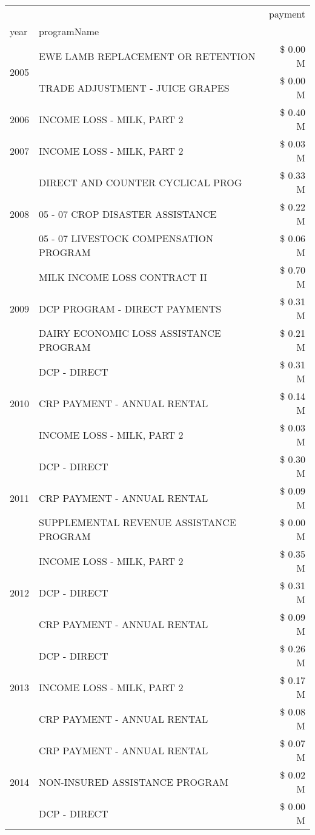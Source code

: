\begin{tabular}{llr}
\toprule
 &  & payment \\
year & programName &  \\
\midrule
\multirow[t]{2}{*}{2005} & EWE LAMB REPLACEMENT OR RETENTION & \$ 0.00 M \\
 & TRADE ADJUSTMENT - JUICE GRAPES & \$ 0.00 M \\
\cline{1-3}
2006 & INCOME LOSS - MILK, PART 2 & \$ 0.40 M \\
\cline{1-3}
2007 & INCOME LOSS - MILK, PART 2 & \$ 0.03 M \\
\cline{1-3}
\multirow[t]{3}{*}{2008} & DIRECT AND COUNTER CYCLICAL PROG & \$ 0.33 M \\
 & 05 - 07 CROP DISASTER ASSISTANCE & \$ 0.22 M \\
 & 05 - 07 LIVESTOCK COMPENSATION PROGRAM & \$ 0.06 M \\
\cline{1-3}
\multirow[t]{3}{*}{2009} & MILK INCOME LOSS CONTRACT II & \$ 0.70 M \\
 & DCP PROGRAM - DIRECT PAYMENTS & \$ 0.31 M \\
 & DAIRY ECONOMIC LOSS ASSISTANCE PROGRAM & \$ 0.21 M \\
\cline{1-3}
\multirow[t]{3}{*}{2010} & DCP - DIRECT & \$ 0.31 M \\
 & CRP PAYMENT - ANNUAL RENTAL & \$ 0.14 M \\
 & INCOME LOSS - MILK, PART 2 & \$ 0.03 M \\
\cline{1-3}
\multirow[t]{3}{*}{2011} & DCP - DIRECT & \$ 0.30 M \\
 & CRP PAYMENT - ANNUAL RENTAL & \$ 0.09 M \\
 & SUPPLEMENTAL REVENUE ASSISTANCE PROGRAM & \$ 0.00 M \\
\cline{1-3}
\multirow[t]{3}{*}{2012} & INCOME LOSS - MILK, PART 2 & \$ 0.35 M \\
 & DCP - DIRECT & \$ 0.31 M \\
 & CRP PAYMENT - ANNUAL RENTAL & \$ 0.09 M \\
\cline{1-3}
\multirow[t]{3}{*}{2013} & DCP - DIRECT & \$ 0.26 M \\
 & INCOME LOSS - MILK, PART 2 & \$ 0.17 M \\
 & CRP PAYMENT - ANNUAL RENTAL & \$ 0.08 M \\
\cline{1-3}
\multirow[t]{3}{*}{2014} & CRP PAYMENT - ANNUAL RENTAL & \$ 0.07 M \\
 & NON-INSURED ASSISTANCE PROGRAM & \$ 0.02 M \\
 & DCP - DIRECT & \$ 0.00 M \\

\end{tabular}

